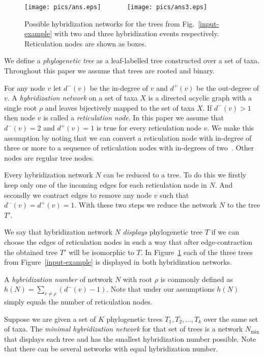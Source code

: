 \documentclass[runningheads, envcountsame, a4paper]{llncs}
\begin{document}
\begin{figure}[t]
  \centering
  \texttt{[image: pics/ans.eps]}
  ~~~~~~
  \texttt{[image: pics/ans3.eps]}
  \caption{Possible hybridization networks for the trees from Fig.~\ref{input-example} with two and three hybridization events respectively. Reticulation nodes are shown as boxes.}
  \label{network-example}
\end{figure}

We define a \emph{phylogenetic tree} as a leaf-labelled tree constructed over a set of taxa. 
Throughout this paper we assume that trees are rooted and binary.

For any node $v$ let $d^-(v)$ be the in-degree of $v$ and $d^+(v)$ be the out-degree of $v$.
A \emph{hybridization network} on a set of taxa $X$ is a directed acyclic graph 
with a single root $\rho$ and leaves bijectively mapped to the set of taxa $X$. If $d^-(v) > 1$ then 
node $v$ is called a \emph{reticulation node}. In this paper we assume that $d^-(v) = 2$ and $d^+(v) = 1$ is true for every reticulation node $v$.
We make this assumption by noting that we can convert a reticulation node with in-degree 
of three or more to a sequence of reticulation nodes with in-degrees of two~\cite{wu2010close}. Other nodes are regular 
tree nodes.

Every hybridization network $N$ can be reduced to a tree. To do this we firstly keep only one of the incoming edges for each reticulation node in $N$. 
And secondly we contract edges to remove any node $v$ such that $d^-(v) = d^+(v) = 1$. With these two steps we reduce the network $N$ 
to the tree $T'$.

We say that hybridization network $N$ \emph{displays} phylogenetic tree $T$ 
if we can choose the edges of reticulation nodes in such a way that after edge-contraction the obtained tree $T'$ will be 
isomorphic to $T$. In Figure~\ref{network-example} each of the three trees from Figure~\ref{input-example} is displayed in both hybridization networks.

A \emph{hybridization number} of network $N$ with root $\rho$ is commonly defined as $h(N) = \sum\limits_{v \ne \rho} (d^-(v) - 1)$.
Note that under our assumptions $h(N)$ simply equals the number of reticulation nodes.

Suppose we are given a set of $K$ phylogenetic trees $T_1, T_2, \dots, T_k$ over the same set of taxa. The \emph{minimal 
hybridization network} for that set of trees is a network $N\mathrm{_{min}}$ that displays each tree and has the smallest 
hybridization number possible. Note that there can be several networks with equal hybridization number.
\end{document}
